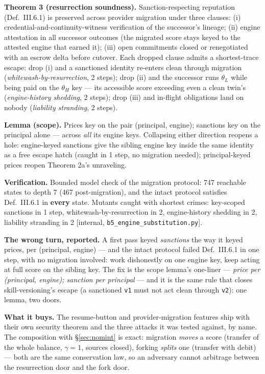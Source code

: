 \documentclass[11pt,a4paper]{article}
\begin{document}
\begin{thebox}
\textbf{Theorem 3 (resurrection soundness).} Sanction-respecting reputation (Def.~III.6.1) is preserved across provider migration
under three clauses: (i) credential-and-continuity-witness verification of the successor's lineage; (ii) engine attestation in all
successor outcomes (the migrated score stays keyed to the attested engine that earned it); (iii) open commitments closed or
renegotiated with an escrow delta before cutover. Each dropped clause admits a shortest-trace escape: drop (i) and a sanctioned
identity re-enters clean through migration (\emph{whitewash-by-resurrection}, 2 steps); drop (ii) and the successor runs
$\theta_L$ while being paid on the $\theta_H$ key --- its accessible score exceeding even a clean twin's
(\emph{engine-history shedding}, 2 steps); drop (iii) and in-flight obligations land on nobody (\emph{liability stranding}, 2
steps).

\textbf{Lemma (scope).} Prices key on the pair (principal, engine); sanctions key on the principal alone --- across \emph{all} its
engine keys. Collapsing either direction reopens a hole: engine-keyed sanctions give the sibling engine key inside the same
identity as a free escape hatch (caught in 1 step, no migration needed); principal-keyed prices reopen Theorem 2a's unraveling.

\textbf{Verification.} Bounded model check of the migration protocol: 747 reachable states to depth 7 (467 post-migration), and
the intact protocol satisfies Def.~III.6.1 in \textbf{every} state. Mutants caught with shortest crimes: key-scoped sanctions in 1
step, whitewash-by-resurrection in 2, engine-history shedding in 2, liability stranding in 2 [internal,
\texttt{b5\_engine\_substitution.py}].
\end{thebox}

\textbf{The wrong turn, reported.} A first pass keyed \emph{sanctions} the way it keyed prices, per (principal, engine) --- and
the intact protocol failed Def.~III.6.1 in one step, with no migration involved: work dishonestly on one engine key, keep acting at
full score on the sibling key. The fix is the scope lemma's one-liner --- \emph{price per (principal, engine); sanction per
principal} --- and it is the same rule that closes skill-versioning's escape (a sanctioned \texttt{v1} must not act clean through
\texttt{v2}): one lemma, two doors.

\textbf{What it buys.} The resume-button and provider-migration features ship with their own security theorem and the three attacks
it was tested against, by name. The composition with \S\ref{sec:nomint} is exact: migration \emph{moves} a score (transfer of the
whole balance, $\gamma=1$, sources closed), forking \emph{splits} one (transfer with debit) --- both are the same conservation law,
so an adversary cannot arbitrage between the resurrection door and the fork door.
\end{document}
